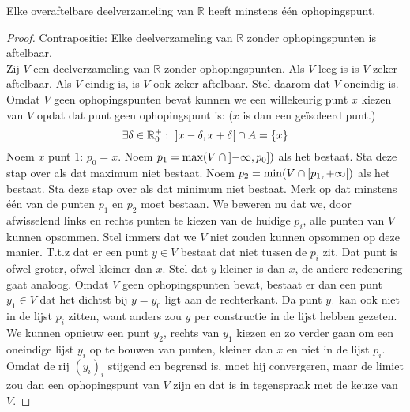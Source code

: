 \documentclass[main.tex]{subfiles}
\begin{document}
\begin{st}
  Elke overaftelbare deelverzameling van $\mathbb{R}$ heeft minstens \'e\'en ophopingspunt.

  \begin{proof}
    Contrapositie: Elke deelverzameling van $\mathbb{R}$ zonder ophopingspunten is aftelbaar.\\
    Zij $V$ een deelverzameling van $\mathbb{R}$ zonder ophopingspunten.
    Als $V$ leeg is is $V$ zeker aftelbaar.
    Als $V$ eindig is, is $V$ ook zeker aftelbaar.
    Stel daarom dat $V$ oneindig is.
    Omdat $V$ geen ophopingspunten bevat kunnen we een willekeurig punt $x$ kiezen van $V$ opdat dat punt geen ophopingspunt is: ($x$ is dan een ge\"isoleerd punt.)
    \[ \exists \delta \in \mathbb{R}_{0}^{+}:\ \interval[open]{x-\delta}{x+\delta} \cap A = \{x\} \]
    Noem $x$ punt $1$: $p_{0} = x$.
    Noem $p_{1} = \max( V \cap \interval[open left]{-\infty}{p_{0}})$ als het bestaat. Sta deze stap over als dat maximum niet bestaat.
    Noem $p_{2} = \min(V \cap \interval[open right]{p_{1}}{+\infty})$ als het bestaat.
    Sta deze stap over als dat minimum niet bestaat.
    Merk op dat minstens \'e\'en van de punten $p_{1}$ en $p_{2}$ moet bestaan.
    We beweren nu dat we, door afwisselend links en rechts punten te kiezen van de huidige $p_{i}$, alle punten van $V$ kunnen opsommen.
    Stel immers dat we $V$ niet zouden kunnen opsommen op deze manier.
    T.t.z dat er een punt $y\in V$ bestaat dat niet tussen de $p_{i}$ zit.
    Dat punt is ofwel groter, ofwel kleiner dan $x$.
    Stel dat $y$ kleiner is dan $x$, de andere redenering gaat analoog.
    Omdat $V$ geen ophopingspunten bevat, bestaat er dan een punt $y_{1}\in V$ dat het dichtst bij $y=y_{0}$ ligt aan de rechterkant.
    Da punt $y_{1}$ kan ook niet in de lijst $p_{i}$ zitten, want anders zou $y$ per constructie in de lijst hebben gezeten.
    We kunnen opnieuw een punt $y_{2}$, rechts van $y_{1}$ kiezen en zo verder gaan om een oneindige lijst $y_{i}$ op te bouwen van punten, kleiner dan $x$ en niet in de lijst $p_{i}$.
    Omdat de rij $(y_{i})_{i}$ stijgend en begrensd is, moet hij convergeren, maar de limiet zou dan een ophopingspunt van $V$ zijn en dat is in tegenspraak met de keuze van $V$.
  \end{proof}
\feed
\end{st}
\end{document}
